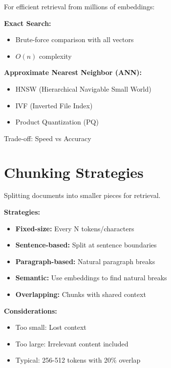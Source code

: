 \begin{infobox}
For efficient retrieval from millions of embeddings:

\textbf{Exact Search:}
\begin{itemize}
    \item Brute-force comparison with all vectors
    \item $O(n)$ complexity
\end{itemize}

\textbf{Approximate Nearest Neighbor (ANN):}
\begin{itemize}
    \item HNSW (Hierarchical Navigable Small World)
    \item IVF (Inverted File Index)
    \item Product Quantization (PQ)
\end{itemize}

Trade-off: Speed vs Accuracy
\end{infobox}

\section{Chunking Strategies}

\begin{definitionbox}
Splitting documents into smaller pieces for retrieval.

\textbf{Strategies:}
\begin{itemize}
    \item \textbf{Fixed-size:} Every N tokens/characters
    \item \textbf{Sentence-based:} Split at sentence boundaries
    \item \textbf{Paragraph-based:} Natural paragraph breaks
    \item \textbf{Semantic:} Use embeddings to find natural breaks
    \item \textbf{Overlapping:} Chunks with shared context
\end{itemize}

\textbf{Considerations:}
\begin{itemize}
    \item Too small: Lost context
    \item Too large: Irrelevant content included
    \item Typical: 256-512 tokens with 20\% overlap
\end{itemize}
\end{definitionbox}

